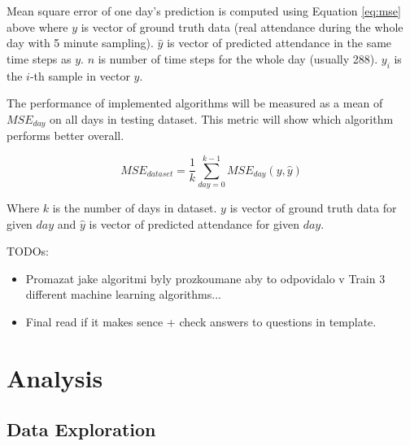 \documentclass{article}
\begin{document}
Mean square error of one day's prediction is computed using Equation \ref{eq:mse} above where $y$ is vector of ground truth data (real attendance during the whole day with 5 minute sampling). $\hat{y}$ is vector of predicted attendance in the same time steps as $y$. $n$ is number of time steps for the whole day (usually 288). $y_i$ is the $i$-th sample in vector $y$. 

The performance of implemented algorithms will be measured as a mean of $MSE_{day}$ on all days in testing dataset. This metric will show which algorithm performs better overall.

\begin{equation}
\label{eq:mse_all}
MSE_{dataset} = \dfrac{1}{k} \sum^{k-1}_{day=0}MSE_{day}(y,\hat{y})
\end{equation}

Where $k$ is the number of days in dataset. $y$ is vector of ground truth data for given $day$ and $\hat{y}$ is vector of predicted attendance for given $day$.


\color{red}
TODOs:
\begin{itemize}
    \item Promazat jake algoritmi byly prozkoumane aby to odpovidalo v Train 3 different machine learning algorithms...
    \item Final read if it makes sence + check answers to questions in template.
\end{itemize}
\color{black}

\section{Analysis}
\subsection{Data Exploration} \label{sec:data_exploration}
\end{document}
